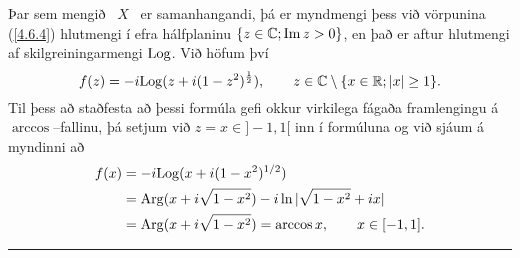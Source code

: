 \begin{sy}
Þar sem mengið \  $X$ \ er saman\-hangandi, þá er myndmengi þess við
vörpunina (\ref{4.6.4}) hlutmengi í efra hálfplaninu ${\{z\in {\mathbb C}; {\operatorname{Im\, }}
z>0\}}$, en það er aftur hlutmengi af skil\-grein\-ingar\-mengi ${\operatorname{Log}}$.
Við höfum því 
$$f(z) = -i{\operatorname{Log}} (z+i(1-z^2)^{\frac 12}), 
\qquad z\in {\mathbb C}\setminus{\{x\in {\mathbb R};
|x|\geq 1\}}. $$
Til þess að staðfesta að þessi formúla gefi okkur virkilega fágaða
framlengingu 
á $\arccos$--fallinu, þá setjum við $z=x\in ]-1,1[$ inn í formúluna
og við sjáum á myndinni að 
\begin{align*}
f(x)&=-i{\operatorname{Log}}(x+i(1-x^2)^{1/2})\\ 
&={\operatorname{Arg}} (x+i\sqrt{1-x^2})-i\ln|\sqrt{1-x^2}+ix|\\
&={\operatorname{Arg}}(x+i\sqrt{1-x^2})=\arccos x, \qquad x\in [-1,1].
\end{align*}
\end{sy}


\bigskip\hrule\bigskip


